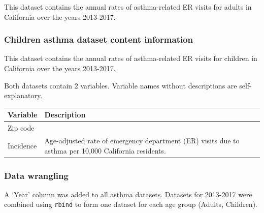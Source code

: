 \documentclass[12pt,]{article}
\begin{document}
This dataset contains the annual rates of asthma-related ER visits for
adults in California over the years 2013-2017.

\hypertarget{children-asthma-dataset-content-information}{%
\subsubsection{Children asthma dataset content
information}\label{children-asthma-dataset-content-information}}

This dataset contains the annual rates of asthma-related ER visits for
children in California over the years 2013-2017.

Both datasets contain 2 variables. Variable names without descriptions
are self-explanatory.

\begin{longtable}[]{@{}ll@{}}
\toprule
\begin{minipage}[b]{0.47\columnwidth}\raggedright
Variable\strut
\end{minipage} & \begin{minipage}[b]{0.47\columnwidth}\raggedright
Description\strut
\end{minipage}\tabularnewline
\midrule
\endhead
\begin{minipage}[t]{0.47\columnwidth}\raggedright
Zip code\strut
\end{minipage} & \begin{minipage}[t]{0.47\columnwidth}\raggedright
\strut
\end{minipage}\tabularnewline
\begin{minipage}[t]{0.47\columnwidth}\raggedright
Incidence\strut
\end{minipage} & \begin{minipage}[t]{0.47\columnwidth}\raggedright
Age-adjusted rate of emergency department (ER) visits due to asthma per
10,000 California residents.\strut
\end{minipage}\tabularnewline
\bottomrule
\end{longtable}

\hypertarget{data-wrangling-1}{%
\subsubsection{Data wrangling}\label{data-wrangling-1}}

A `Year' column was added to all asthma datasets. Datasets for 2013-2017
were combined using \texttt{rbind} to form one dataset for each age
group (Adults, Children).
\end{document}
